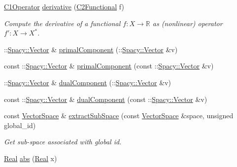 \begin{DoxyCompactItemize}
\item 
\hyperlink{classSpacy_1_1C1Operator}{C1\-Operator} \hyperlink{namespaceSpacy_a002fe344fa6d04a6ac59a74ea25fddb6}{derivative} (\hyperlink{classSpacy_1_1C2Functional}{C2\-Functional} f)
\begin{DoxyCompactList}\small\item\em Compute the derivative of a functional $ f: X\to \mathbb{R} $ as (nonlinear) operator $ f':X\to X^* $. \end{DoxyCompactList}\item 
\-::\hyperlink{classSpacy_1_1Vector}{Spacy\-::\-Vector} \& \hyperlink{group__ProductSpaceGroup_gaa040ba5c24284687e0df19c99dd688a6}{primal\-Component} (\-::\hyperlink{classSpacy_1_1Vector}{Spacy\-::\-Vector} \&v)
\item 
const \-::\hyperlink{classSpacy_1_1Vector}{Spacy\-::\-Vector} \& \hyperlink{group__ProductSpaceGroup_ga88c5bcc74072f75c63ab7d9448f80a7e}{primal\-Component} (const \-::\hyperlink{classSpacy_1_1Vector}{Spacy\-::\-Vector} \&v)
\item 
\-::\hyperlink{classSpacy_1_1Vector}{Spacy\-::\-Vector} \& \hyperlink{group__ProductSpaceGroup_gafe51c084e3b03205db94e91309e834f7}{dual\-Component} (\-::\hyperlink{classSpacy_1_1Vector}{Spacy\-::\-Vector} \&v)
\item 
const \-::\hyperlink{classSpacy_1_1Vector}{Spacy\-::\-Vector} \& \hyperlink{group__ProductSpaceGroup_gabe5978657aab46b1575e2521b336407d}{dual\-Component} (const \-::\hyperlink{classSpacy_1_1Vector}{Spacy\-::\-Vector} \&v)
\item 
\hypertarget{group__ProductSpaceGroup_ga6054e5c78652ac4959f5d521acadd86a}{const \hyperlink{classSpacy_1_1VectorSpace}{Vector\-Space} \& \hyperlink{group__ProductSpaceGroup_ga6054e5c78652ac4959f5d521acadd86a}{extract\-Sub\-Space} (const \hyperlink{classSpacy_1_1VectorSpace}{Vector\-Space} \&space, unsigned global\-\_\-id)}\label{group__ProductSpaceGroup_ga6054e5c78652ac4959f5d521acadd86a}

\begin{DoxyCompactList}\small\item\em Get sub-\/space associated with global id. \end{DoxyCompactList}\item 
\hypertarget{namespaceSpacy_a89ed08f6f5a05e3f35afa37fcebf4b06}{\hyperlink{classSpacy_1_1Real}{Real} \hyperlink{namespaceSpacy_a89ed08f6f5a05e3f35afa37fcebf4b06}{abs} (\hyperlink{classSpacy_1_1Real}{Real} x)}\label{namespaceSpacy_a89ed08f6f5a05e3f35afa37fcebf4b06}


\end{DoxyCompactItemize}
